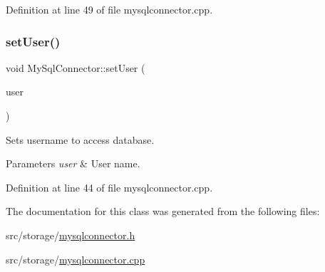Definition at line 49 of file mysqlconnector.\+cpp.

\mbox{\label{classMySqlConnector_a0cf4bedae2d4093449590aa59d200ce8}} 
\subsubsection{\texorpdfstring{set\+User()}{setUser()}}
{\footnotesize\ttfamily void My\+Sql\+Connector\+::set\+User (\begin{DoxyParamCaption}\item[{const Q\+String}]{user }\end{DoxyParamCaption})}



Sets username to access database. 


\begin{DoxyParams}{Parameters}
{\em user} & User name. \\
\hline
\end{DoxyParams}


Definition at line 44 of file mysqlconnector.\+cpp.



The documentation for this class was generated from the following files\+:\begin{DoxyCompactItemize}
\item 
src/storage/\mbox{\hyperlink{mysqlconnector_8h}{mysqlconnector.\+h}}\item 
src/storage/\mbox{\hyperlink{mysqlconnector_8cpp}{mysqlconnector.\+cpp}}\end{DoxyCompactItemize}
